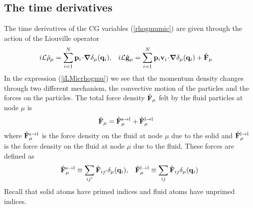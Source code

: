 \documentclass[b5paper,openright,10pt]{book}
\newcommand{\esc}{\!\cdot\!}
\begin{document}
\subsection{The time derivatives}
The time derivatives  of the CG variables  (\ref{rhogmumic}) are given
through the action of the Liouville operator
\begin{align}
  i{\cal L}  \hat{\rho}_{\mu}&=\sum_{i=1}^N{\bf p}_i\esc\boldsymbol{\nabla}\delta_\mu({\bf q}_i),&
i{\cal L}  \hat{\bf g}_{\mu}&=\sum_{i=1}^N{\bf p}_i{\bf v}_i\esc\boldsymbol{\nabla}\delta_\mu({\bf q}_i)
+\hat{\bf F}_\mu
\label{iLMicrhogmu}
\end{align}
In the expression (\ref{iLMicrhogmu}) we see that the momentum density
changes through two different mechanism,  the convective motion of the
particles and  the forces on  the particles.  The total  force density
$\hat{\bf F}_\mu$ felt by the fluid particles at node $\mu$ is
\begin{align}
\hat{\bf F}_\mu&=    \hat{\bf F}^{\rm s\to l}_\mu+  \hat{\bf F}^{\rm l\to l}_\mu
\end{align}
where $  \hat{\bf F}^{\rm  s\to l}_\mu$  is the  force density  on the
fluid  at node  $\mu$ due  to the  solid and  $ \hat{\bf  F}^{\rm l\to
  l}_\mu$ is the force  density on the fluid at node  $\mu$ due to the
fluid. These forces are defined as
\begin{align}
    \hat{\bf F}^{\rm s\to l}_\mu \equiv\sum_{ij'}\hat{\bf F}_{ij'}\delta_\mu({\bf q}_i), &&
 \hat{\bf F}^{\rm l\to l}_\mu \equiv\sum_{ij}\hat{\bf F}_{ij}\delta_\mu({\bf q}_i)
\label{Fbin}
\end{align}
Recall that solid atoms have  primed indices and fluid atoms have unprimed indices.
\end{document}
